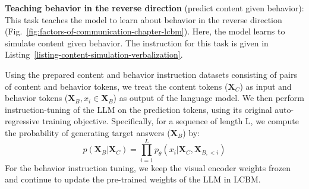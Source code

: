 \textbf{Teaching behavior in the reverse direction} (predict content given behavior): This task teaches the model to learn about behavior in the reverse direction (Fig.~\ref{fig:factors-of-communication-chapter-lcbm}). Here, the model learns to simulate content given behavior. The instruction for this task is given in Listing~\ref{listing-content-simulation-verbalization}.





Using the prepared content and behavior instruction datasets consisting of pairs of content and behavior tokens, we treat the content tokens ($\mathbf{X}_C$) as input and behavior tokens ($\mathbf{X}_B, x_i\in\mathbf{X}_B$) as output of the language model. We then perform instruction-tuning of the LLM on the prediction tokens, using its original auto-regressive training objective. Specifically, for a sequence of length L, we compute the probability of generating target answers ($\mathbf{X}_B$) by:
\begin{equation}
    p(\mathbf{X}_B | \mathbf{X}_C) = \prod_{i=1}^{L} p_{\theta}(x_i | \mathbf{X}_C, \mathbf{X}_{B, <i})
\end{equation}
For the behavior instruction tuning, we keep the visual encoder weights frozen and continue to update the pre-trained weights of the LLM in LCBM. 







